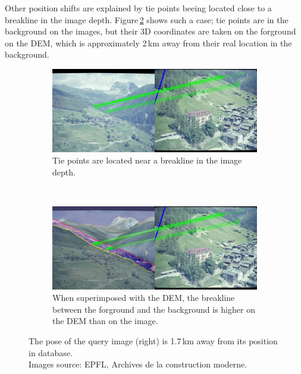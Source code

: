 \documentclass[fleqn,10pt]{wlpeerj} %
\begin{document}
Other position shifts are explained by tie points beeing located close to a breakline
in the image depth. Figure\,\ref{ex2:2} shows such a case; tie points are in the 
background on the images, but their 3D coordinates are taken on the forground on 
the DEM, which is approximately 2\,km away from their real location in the background.

\begin{figure}[H]
\centering
\begin{subfigure}{0.48\linewidth}
    \includegraphics[width=1\linewidth]{ex2.jpg}
    \caption{Tie points are located near a breakline in the image depth.}
    \label{ex2:1}
\end{subfigure}
~
\begin{subfigure}{0.48\linewidth}
    \includegraphics[width=1\linewidth]{ex2_mnt.jpg}
    \caption{When superimposed with the DEM, the breakline between the forground 
    and the background is higher on the DEM than on the image.}
    \label{ex2:2}
\end{subfigure}
\caption[]{The pose of the query image (right) is 1.7\,km away from its position in database.\\
Images source: EPFL, Archives de la construction moderne.}
\label{ex2}
\end{figure}
\end{document}
